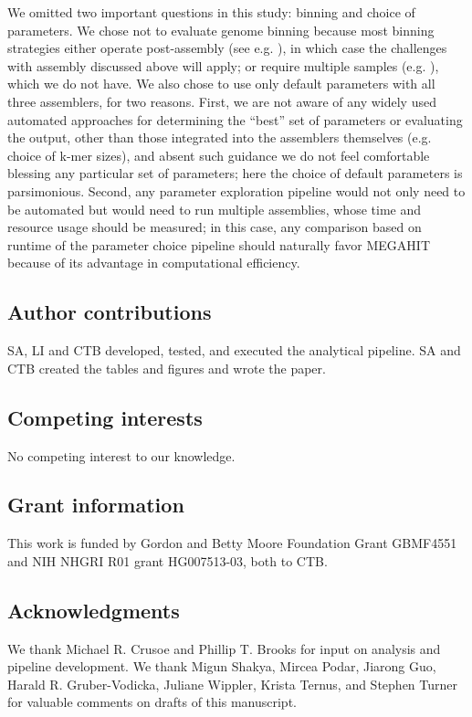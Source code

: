 \documentclass[11pt]{article}
\begin{document}
We omitted two important questions in this study: binning and choice
of parameters.  We chose not to evaluate genome binning because most
binning strategies either operate post-assembly (see
e.g. \cite{laczny2017busybee}), in which case the challenges with
assembly discussed above will apply; or require multiple samples
(e.g. \cite{Cleary2015}), which we do not have.  We also chose to use
only default parameters with all three assemblers, for two reasons.
First, we are not aware of any widely used automated approaches for
determining the ``best'' set of parameters or evaluating the output,
other than those integrated into the assemblers themselves
(e.g. choice of k-mer sizes), and absent such guidance we do not feel
comfortable blessing any particular set of parameters; here the choice
of default parameters is parsimonious.  Second, any parameter
exploration pipeline would not only need to be automated but would
need to run multiple assemblies, whose time and resource usage should
be measured; in this case, any comparison based on
runtime of the parameter choice pipeline should naturally favor MEGAHIT
because of its advantage in computational efficiency.

\subsection*{Author contributions}

SA, LI and CTB developed, tested, and executed the analytical pipeline.
SA and CTB created the tables and figures and wrote the paper.

\subsection*{Competing interests}
No competing interest to our knowledge.

\subsection*{Grant information}
This work is funded by
Gordon and Betty Moore Foundation Grant GBMF4551 and
NIH NHGRI R01 grant HG007513-03, both to CTB.

\subsection*{Acknowledgments}
We thank Michael R. Crusoe and Phillip T. Brooks for input on analysis
and pipeline development.  We thank Migun Shakya, Mircea Podar, Jiarong Guo,
Harald R. Gruber-Vodicka, Juliane Wippler, Krista Ternus, and Stephen
Turner for valuable comments on drafts of this manuscript.
\end{document}
